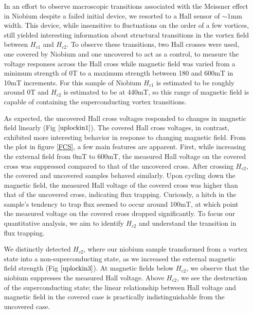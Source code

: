 \documentclass[twocolumn,aps,prl]{revtex4-1} %
\begin{document}
In an effort to observe macroscopic transitions associated with the Meissner effect in Niobium despite a failed initial device, we resorted to a Hall sensor of $\sim$1mm width. This device, while insensitive to fluctuations on the order of a few vortices, still yielded interesting information about structural transitions in the vortex field between $H_{c1}$ and $H_{c2}$. To observe these transitions, two Hall crosses were used, one covered by Niobium and one uncovered to act as a control, to measure the voltage responses across the Hall cross while magnetic field was varied from a minimum strength of 0T to a maximum strength between 180 and 600mT in 10mT increments. For this sample of Niobium $H_{c1}$ is estimated to be roughly around 0T and $H_{c2}$ is estimated to be at 440mT, so this range of magnetic field is capable of containing the superconducting vortex transitions.


As expected, the uncovered Hall cross voltages responded to changes in magnetic field linearly (Fig $\ref{uplockin1}$). The covered Hall cross voltages, in contrast, exhibited more interesting behavior in response to changing magnetic field. From the plot in figure \ref{FCS}, a few main features are apparent. First, while increasing the external field from 0mT to 600mT, the measured Hall voltage on the covered cross was suppressed compared to that of the uncovered cross. After crossing $H_{c2}$, the covered and uncovered samples behaved similarly. Upon cycling down the magnetic field, the measured Hall voltage of the covered cross was higher than that of the uncovered cross, indicating flux trapping. Curiously, a hitch in the sample's tendency to trap flux seemed to occur around 100mT, at which point the measured voltage on the covered cross dropped significantly. To focus our quantitative analysis, we aim to identify $H_{c2}$ and understand the transition in flux trapping.

We distinctly detected $H_{c2}$, where our niobium sample transformed from a vortex state into a non-superconducting state, as we increased the external magnetic field strength (Fig $\ref{uplockin3}$). At magnetic fields below $H_{c2}$, we observe that the niobium suppresses the measured Hall voltage. Above $H_{c2}$, we see the destruction of the superconducting state; the linear relationship between Hall voltage and magnetic field in the covered case is practically indistinguishable from the uncovered case.
\end{document}
